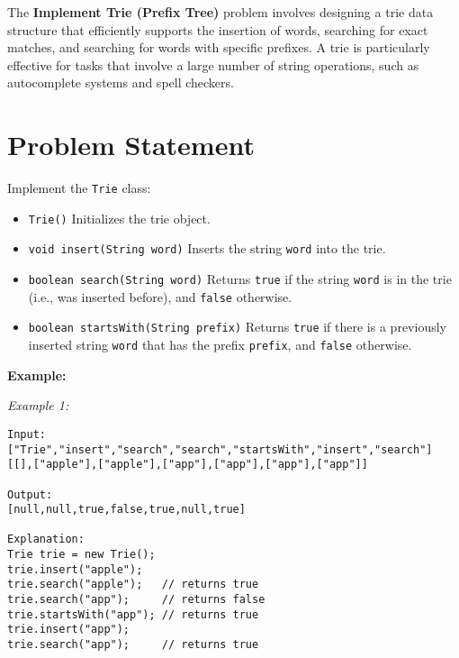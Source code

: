 
\label{problem:implement_trie_prefix_tree}

The \textbf{Implement Trie (Prefix Tree)} problem involves designing a trie data structure that efficiently supports the insertion of words, searching for exact matches, and searching for words with specific prefixes. A trie is particularly effective for tasks that involve a large number of string operations, such as autocomplete systems and spell checkers.

\section*{Problem Statement}

Implement the \texttt{Trie} class:

\begin{itemize}
    \item \texttt{Trie()} Initializes the trie object.
    \item \texttt{void insert(String word)} Inserts the string \texttt{word} into the trie.
    \item \texttt{boolean search(String word)} Returns \texttt{true} if the string \texttt{word} is in the trie (i.e., was inserted before), and \texttt{false} otherwise.
    \item \texttt{boolean startsWith(String prefix)} Returns \texttt{true} if there is a previously inserted string \texttt{word} that has the prefix \texttt{prefix}, and \texttt{false} otherwise.
\end{itemize}

\textbf{Example:}

\textit{Example 1:}

\begin{verbatim}
Input:
["Trie","insert","search","search","startsWith","insert","search"]
[[],["apple"],["apple"],["app"],["app"],["app"],["app"]]

Output:
[null,null,true,false,true,null,true]

Explanation:
Trie trie = new Trie();
trie.insert("apple");
trie.search("apple");   // returns true
trie.search("app");     // returns false
trie.startsWith("app"); // returns true
trie.insert("app");   
trie.search("app");     // returns true
\end{verbatim}

